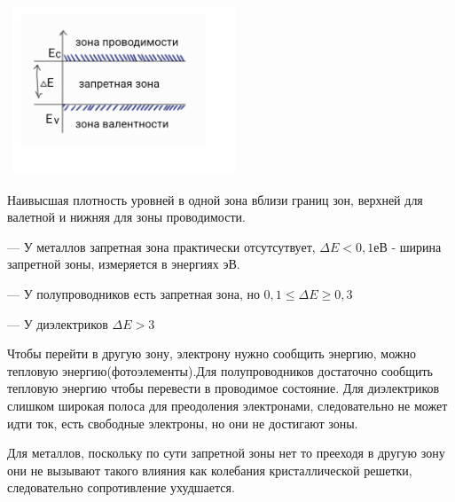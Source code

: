 \documentclass[../main.tex]{subfiles}
\begin{document}
\begin{center}
    \includegraphics[height=5cm, width=7cm]{../img/kvantovy5.png}
\end{center}

Наивысшая плотность уровней в одной зона вблизи границ зон, верхней для валетной и нижняя для зоны проводимости.

\vspace{15px}

--- У металлов запретная зона практически отсутсутвует, $\Delta E < 0,1 $еВ - ширина запретной зоны, измеряется в энергиях эВ.

--- У полупроводников есть запретная зона, но $ 0,1 \leq \Delta E \geq 0,3$

--- У диэлектриков $\Delta E > 3 $

Чтобы перейти в другую зону, электрону нужно сообщить энергию, можно тепловую энергию(фотоэлементы).Для полупроводников 
достаточно сообщить тепловую энергию чтобы перевести в проводимое состояние. Для диэлектриков слишком широкая полоса для преодоления электронами, следовательно
не может идти ток, есть свободные электроны, но они не достигают зоны.

Для металлов, поскольку по сути запретной зоны нет то прееходя в другую зону они не вызывают такого влияния как колебания кристаллической решетки, следовательно 
сопротивление ухудшается.
\end{document}
